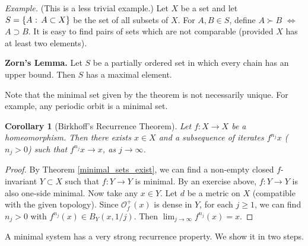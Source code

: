 \documentclass[12pt]{article}
\newtheorem{corollary}[theorem]{Corollary}
\theoremstyle{definition}
\theoremstyle{remark}
\begin{document}
\medskip
\noindent
{\it Example.} (This is a less trivial example.)
Let $X$ be a set and let $S =\{A \hbox{ : } A \subset X\}$ be the set
of all subsets of $X$. For $A,B \in S$, define
$A \succ B$ $\iff$ $A \supset B$.
It is easy to find pairs of sets which are not comparable (provided
$X$ has at least two elements).






\medskip
\noindent
{\bf Zorn's Lemma.}
Let $S$ be a partially ordered set in which every chain has an upper
bound.
Then $S$ has a maximal element.
%

\medskip

Note that the minimal set given by the theorem is not necessarily unique. For example, any periodic orbit is a
minimal set.

\begin{corollary}[Birkhoff's Recurrence Theorem] \label{birkhoff_rec_th}
Let $f : X \to X$ be a homeomorphism. Then there exists $x \in X$ and a subsequence 
of iterates $f^{n_j}x$ ($n_j>0$)
such that 
$f^{n_j}x \to x$, as $j \to \infty$.
\end{corollary}

\begin{proof}
By Theorem \ref{minimal_sets_exist}, we can find a non-empty closed $f$-invariant $Y \subset X$ such that 
$f : Y \to Y$ is minimal. By an exercise above, $f : Y \to Y$ is also one-side minimal.
Now take any $x \in Y$. Let $d$ be a metric on $X$ (compatible with the given topology).
Since $\mathcal O_f^+(x)$ is dense in $Y$, for each $j \ge 1$, we can find $n_j>0$
with $f^{n_j}(x) \in B_Y(x,1/j)$. Then $\lim_{j \to \infty} f^{n_j}(x) =x$. 
\end{proof}

A minimal system has a very strong recurrence property. We show it in two steps.
\end{document}
